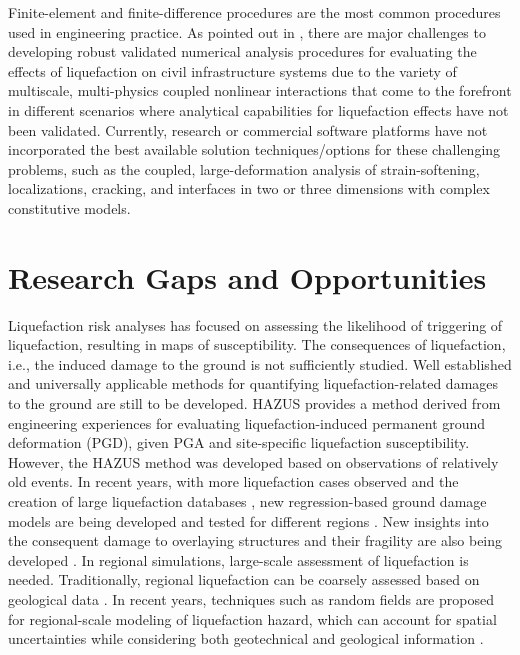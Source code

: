 Finite-element and finite-difference procedures are the most common procedures used in engineering practice. As pointed out in \cite{bray2017new}, there are major challenges to developing robust validated numerical analysis procedures for evaluating the effects of liquefaction on civil infrastructure systems due to the variety of multiscale, multi-physics coupled nonlinear interactions that come to the forefront in different scenarios where analytical capabilities for liquefaction effects have not been validated. Currently, research or commercial software platforms have not incorporated the best available solution techniques/options for these challenging problems, such as the coupled, large-deformation analysis of strain-softening, localizations, cracking, and interfaces in two or three dimensions with complex constitutive models. 

\section{Research Gaps and Opportunities}
\label{sec:eq_liq_gaps}

Liquefaction risk analyses has focused on assessing the likelihood of triggering of liquefaction, resulting in maps of susceptibility. The consequences of liquefaction, i.e., the induced damage to the ground is not sufficiently studied. Well established and universally applicable methods for quantifying liquefaction-related damages to the ground are still to be developed. HAZUS provides a method derived from engineering experiences for evaluating liquefaction-induced permanent ground deformation (PGD), given PGA and site-specific liquefaction susceptibility. However, the HAZUS method was developed based on observations of relatively old events. In recent years, with more liquefaction cases observed \citep{cubrinovski2017liquefaction,bray2017new} and the creation of large liquefaction databases \citep{brandenberg2020nextgeneration}, new regression-based ground damage models are being developed \citep{khoshnevisan2015probabilistic,stewart2016peerngl} and tested for different regions \citep{chen2016probabilistic}. New insights into the consequent damage to overlaying structures and their fragility are also being developed \citep{bray20176th,fotopoulou2018vulnerability}. In regional simulations, large-scale assessment of liquefaction is needed. Traditionally, regional liquefaction can be coarsely assessed based on geological data \citep{holzer2006liquefaction}. In recent years, techniques such as random fields are proposed for regional-scale modeling of liquefaction hazard, which can account for spatial uncertainties while considering both geotechnical and geological information \citep{zhu2017updated,wang2017spatial,wang2018hybrid}.



